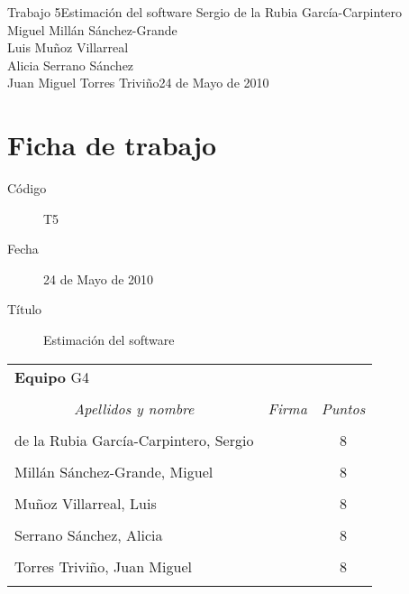 \documentclass[11pt,a4paper,spanish,twoside]{book}
\begin{document}


{Trabajo 5}{Estimación del software}
{Sergio de la Rubia García-Carpintero\\Miguel Millán Sánchez-Grande\\
  Luis Muñoz Villarreal\\Alicia Serrano Sánchez\\
  Juan Miguel Torres Triviño}{24 de Mayo de 2010}


\chapter*{Ficha de trabajo}
\begin{description}
\item[Código] T5
\item[Fecha] 24 de Mayo de 2010
\item[Título] Estimación del software
\end{description}

\begin{table}[!ht]
  \centering
  \begin{tabular}{lp{5cm}c}
    \multicolumn{3}{l}{\Large \textbf{Equipo} G4} \\ \\
    \multicolumn{1}{c}{\emph{Apellidos y nombre}} & 
    \multicolumn{1}{c}{\emph{Firma}} & \emph{Puntos} \\
    \hline \\
    de la Rubia García-Carpintero, Sergio & & 8 \\ \\
    Millán Sánchez-Grande, Miguel         & & 8 \\ \\
    Muñoz Villarreal, Luis                & & 8 \\ \\
    Serrano Sánchez, Alicia               & & 8 \\ \\
    Torres Triviño, Juan Miguel           & & 8 \\ \\
    \hline
  \end{tabular}
\end{table}
\end{document}
